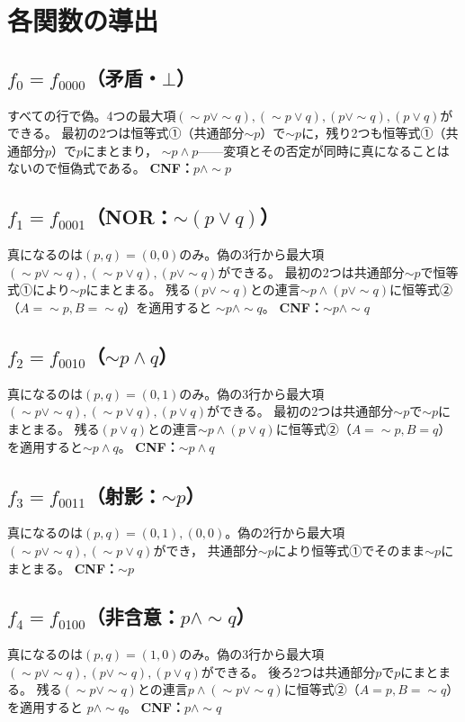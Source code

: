 \documentclass[autodetect-engine,dvi=dvipdfmx,ja=standard]{bxjsarticle}
\begin{document}
\section{各関数の導出}

\subsection*{\(f_0=f_{0000}\)（矛盾・\(\bot\)）}
すべての行で偽。4つの最大項\((\sim p\lor\sim q),(\sim p\lor q),(p\lor\sim q),(p\lor q)\)ができる。
最初の2つは恒等式①（共通部分\(\sim p\)）で\(\sim p\)に，残り2つも恒等式①（共通部分\(p\)）で\(p\)にまとまり，
\(\sim p\land p\)——変項とその否定が同時に真になることはないので恒偽式である。
\textbf{CNF：}\(p\land\sim p\)

\subsection*{\(f_1=f_{0001}\)（NOR：\(\sim(p\lor q)\)）}
真になるのは\((p,q)=(0,0)\)のみ。偽の3行から最大項
\((\sim p\lor\sim q),(\sim p\lor q),(p\lor\sim q)\)ができる。
最初の2つは共通部分\(\sim p\)で恒等式①により\(\sim p\)にまとまる。
残る\((p\lor\sim q)\)との連言\(\sim p\land(p\lor\sim q)\)に恒等式②（\(A=\sim p,B=\sim q\)）を適用すると
\(\sim p\land\sim q\)。
\textbf{CNF：}\(\sim p\land\sim q\)

\subsection*{\(f_2=f_{0010}\)（\(\sim p\land q\)）}
真になるのは\((p,q)=(0,1)\)のみ。偽の3行から最大項
\((\sim p\lor\sim q),(\sim p\lor q),(p\lor q)\)ができる。
最初の2つは共通部分\(\sim p\)で\(\sim p\)にまとまる。
残る\((p\lor q)\)との連言\(\sim p\land(p\lor q)\)に恒等式②（\(A=\sim p,B=q\)）を適用すると\(\sim p\land q\)。
\textbf{CNF：}\(\sim p\land q\)

\subsection*{\(f_3=f_{0011}\)（射影：\(\sim p\)）}
真になるのは\((p,q)=(0,1),(0,0)\)。偽の2行から最大項\((\sim p\lor\sim q),(\sim p\lor q)\)ができ，
共通部分\(\sim p\)により恒等式①でそのまま\(\sim p\)にまとまる。
\textbf{CNF：}\(\sim p\)

\subsection*{\(f_4=f_{0100}\)（非含意：\(p\land\sim q\)）}
真になるのは\((p,q)=(1,0)\)のみ。偽の3行から最大項
\((\sim p\lor\sim q),(p\lor\sim q),(p\lor q)\)ができる。
後ろ2つは共通部分\(p\)で\(p\)にまとまる。
残る\((\sim p\lor\sim q)\)との連言\(p\land(\sim p\lor\sim q)\)に恒等式②（\(A=p,B=\sim q\)）を適用すると
\(p\land\sim q\)。
\textbf{CNF：}\(p\land\sim q\)
\end{document}
